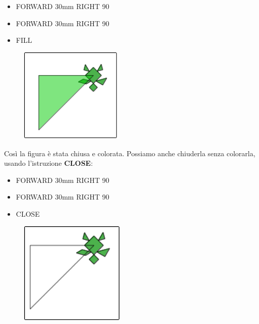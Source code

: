 \begin{scriptsize}
\begin{minipage}{0.40\textwidth}
\begin{itemize}[itemsep=-3pt,parsep=2pt]
\item[] FORWARD 30mm RIGHT 90
\item[] FORWARD 30mm RIGHT 90
\item[] FILL                  
\end{itemize}
\end{minipage}
\end{scriptsize}
\begin{minipage}{0.4\textwidth}
\begin{figure}[H]
   \includegraphics[width=5.0cm,trim=4 4 8 4,clip]{./images/disegnare/disegnare-13.png}
   \label{dis-13}
\end{figure}
\end{minipage} \hfill

\vskip 1cm

Così la figura è stata chiusa e colorata. Possiamo anche chiuderla senza
colorarla, usando l'istruzione \textbf{CLOSE}:

\vskip 1cm

\begin{scriptsize}
\begin{minipage}{0.40\textwidth}
\begin{itemize}[itemsep=-3pt,parsep=2pt]
\item[] FORWARD 30mm RIGHT 90
\item[] FORWARD 30mm RIGHT 90
\item[] CLOSE                  
\end{itemize}
\end{minipage}
\end{scriptsize}
\begin{minipage}{0.4\textwidth}
\begin{figure}[H]
   \includegraphics[width=5.0cm,trim=4 4 8 4,clip]{./images/disegnare/disegnare-14.png}
   \label{dis-14}
\end{figure}
\end{minipage} \hfill

